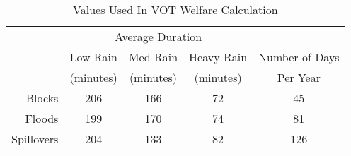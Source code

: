 \captionsetup{labelsep=newline}
\begin{table}[!htbp]
\centering

\caption{Values Used In VOT Welfare Calculation}
\label{table:VOT-main-desc}

  \begin{tabular}{r c c c c}
    \hline
    \hline
    & \multicolumn{3}{c}{Average Duration} & \\
    & Low Rain & Med Rain & Heavy Rain & Number of Days\\
    & (minutes) & (minutes) & (minutes) & Per Year \\
    \hline
    Blocks & 206 & 166 & 72 & 45 \\
    Floods & 199 & 170 & 74 & 81 \\
    Spillovers & 204 & 133 & 82 & 126 \\
    \hline
    \hline
  \end{tabular}
  
\end{table}